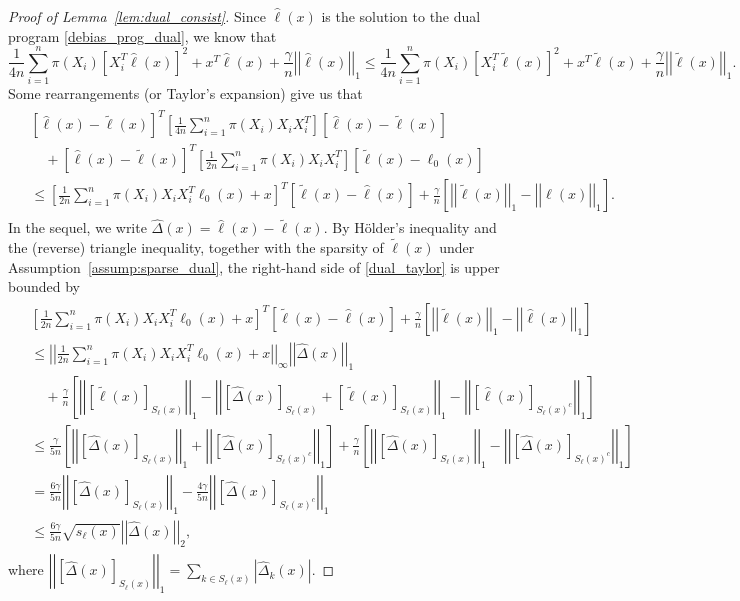 \documentclass[ejsv2,noshowframe]{imsart}
\theoremstyle{plain}
\theoremstyle{definition}
\theoremstyle{remark}
\newcommand{\norm}[1]{\left|\left| #1 \right|\right|}
\renewcommand{\hat}{\widehat}
\renewcommand{\tilde}{\widetilde}
\begin{document}
\begin{proof}[Proof of Lemma~\ref{lem:dual_consist}]
	Since $\hat{\ell}(x)$ is the solution to the dual program \eqref{debias_prog_dual}, we know that
	$$\frac{1}{4n} \sum_{i=1}^n \pi(X_i)\left[X_i^T \hat{\ell}(x)\right]^2 + x^T\hat{\ell}(x) + \frac{\gamma}{n}\norm{\hat{\ell}(x)}_1 \leq \frac{1}{4n} \sum_{i=1}^n \pi(X_i)\left[X_i^T \tilde{\ell}(x)\right]^2 + x^T\tilde{\ell}(x) + \frac{\gamma}{n}\norm{\tilde{\ell}(x)}_1.$$
	Some rearrangements (or Taylor's expansion) give us that
	\begin{align}
		\label{dual_taylor}
		\begin{split}
			&\left[\hat{\ell}(x) - \tilde{\ell}(x)\right]^T \left[\frac{1}{4n}\sum_{i=1}^n \pi(X_i) X_iX_i^T \right] \left[\hat{\ell}(x) - \tilde{\ell}(x)\right] \\
			&\quad + \left[\hat{\ell}(x) - \tilde{\ell}(x)\right]^T \left[\frac{1}{2n}\sum_{i=1}^n \pi(X_i) X_iX_i^T \right] \left[\tilde{\ell}(x) - \ell_0(x)\right]\\
			&\leq \left[\frac{1}{2n} \sum_{i=1}^n \pi(X_i) X_iX_i^T \ell_0(x) +x \right]^T \left[\tilde{\ell}(x) - \hat{\ell}(x) \right] + \frac{\gamma}{n}\left[\norm{\tilde{\ell}(x)}_1 - \norm{\hat{\ell}(x)}_1 \right].
		\end{split}
	\end{align}
	In the sequel, we write $\hat{\Delta}(x) = \hat{\ell}(x) - \tilde{\ell}(x)$. By H{\"o}lder's inequality and the (reverse) triangle inequality, together with the sparsity of $\tilde{\ell}(x)$ under Assumption~\ref{assump:sparse_dual}, the right-hand side of \eqref{dual_taylor} is upper bounded by
	\begin{align}
		\label{dual_taylor_bnd}
		\begin{split}
			&\left[\frac{1}{2n} \sum_{i=1}^n \pi(X_i) X_iX_i^T \ell_0(x) +x \right]^T \left[\tilde{\ell}(x) - \hat{\ell}(x) \right] + \frac{\gamma}{n}\left[\norm{\tilde{\ell}(x)}_1 - \norm{\hat{\ell}(x)}_1 \right] \\
			&\leq \norm{\frac{1}{2n} \sum_{i=1}^n \pi(X_i) X_iX_i^T \ell_0(x) +x}_{\infty} \norm{\hat{\Delta}(x)}_1 \\
			&\quad + \frac{\gamma}{n} \left[\norm{\left[\tilde{\ell}(x)\right]_{S_{\ell}(x)}}_1 - \norm{\left[\hat{\Delta}(x)\right]_{S_{\ell}(x)} + \left[\tilde{\ell}(x)\right]_{S_{\ell}(x)}}_1 - \norm{\left[\hat{\ell}(x)\right]_{S_{\ell}(x)^c}}_1\right]\\
			&\leq \frac{\gamma}{5n} \left[\norm{\left[\hat{\Delta}(x)\right]_{S_{\ell}(x)}}_1 + \norm{\left[\hat{\Delta}(x)\right]_{S_{\ell}(x)^c}}_1 \right] + \frac{\gamma}{n} \left[\norm{\left[\hat{\Delta}(x) \right]_{S_{\ell}(x)}}_1 - \norm{\left[\hat{\Delta}(x) \right]_{S_{\ell}(x)^c}}_1 \right]\\
			&= \frac{6\gamma}{5n} \norm{\left[\hat{\Delta}(x) \right]_{S_{\ell}(x)}}_1 - \frac{4\gamma}{5n} \norm{\left[\hat{\Delta}(x) \right]_{S_{\ell}(x)^c}}_1\\
			&\leq \frac{6\gamma}{5n} \sqrt{s_{\ell}(x)} \norm{\hat{\Delta}(x)}_2,
		\end{split}
	\end{align}
	where $\norm{\left[\hat{\Delta}(x) \right]_{S_{\ell}(x)}}_1 = \sum_{k\in S_{\ell}(x)} \left|\hat{\Delta}_k(x) \right|$. 
	

\end{proof}
\end{document}
